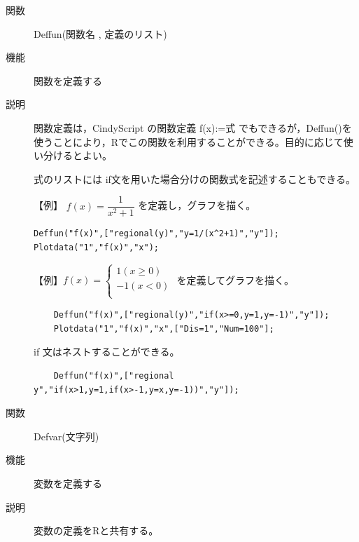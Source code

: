 \documentclass[papersize,a4paper,12pt,uplatex]{jsarticle}
\begin{document}
\begin{description}
\vspace{\baselineskip}
\hypertarget{deffun}{}
\item[関数]  Deffun(関数名 , 定義のリスト)
\item[機能]  関数を定義する
\item[説明]  関数定義は，CindyScript の関数定義 f(x):=式 でもできるが，Deffun()を使うことにより，Rでこの関数を利用することができる。目的に応じて使い分けるとよい。

式のリストには if文を用いた場合分けの関数式を記述することもできる。

\vspace{\baselineskip}
【例】
$f(x)=\dfrac{1}{x^2+1}$ を定義し，グラフを描く。

\begin{verbatim}
Deffun("f(x)",["regional(y)","y=1/(x^2+1)","y"]);
Plotdata("1","f(x)","x");
\end{verbatim}

\vspace{\baselineskip}
\hspace{20mm}\scalebox{0.9}{}

          
\vspace{\baselineskip}
  【例】$f(x)=\left\{\begin{array}{l}1　 (x\geq 0)\\ -1 　 (x<0)\\ \end{array}\right.$     を定義してグラフを描く。

\begin{verbatim}
    Deffun("f(x)",["regional(y)","if(x>=0,y=1,y=-1)","y"]);
    Plotdata("1","f(x)","x",["Dis=1","Num=100"];
\end{verbatim}

\vspace{\baselineskip}
\hspace{20mm}\scalebox{0.9}{}

  if 文はネストすることができる。
\begin{verbatim}
    Deffun("f(x)",["regional y","if(x>1,y=1,if(x>-1,y=x,y=-1))","y"]);
\end{verbatim}

\vspace{\baselineskip}
\hspace{20mm}\scalebox{0.9}{}


\vspace{\baselineskip}
\hypertarget{defvar}{}
\item[関数]  Defvar(文字列)
\item[機能]  変数を定義する
\item[説明]  変数の定義をRと共有する。


\end{description}
\end{document}
